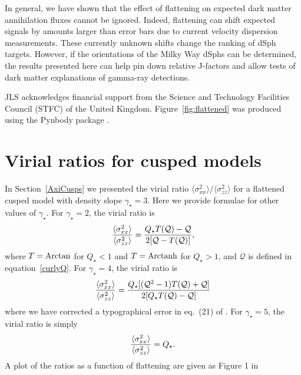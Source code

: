 \documentclass[prd,twocolumn,showpacs,preprintnumbers,superscriptaddress,nofootinbib,amsmath,amssymb,nobalancelastpage]{revtex4}
\def\arctanh{{\rm Arctanh}}
\def\arctan{{\rm Arctan}}
\begin{document}
In general, we have shown that the effect of flattening on expected dark matter annihilation fluxes cannot be ignored. Indeed, flattening can shift expected signals by amounts larger than error bars due to current velocity dispersion measurements. These currently unknown shifts change the ranking of dSph targets. However, if the orientations of the Milky Way dSphs can be determined, the results presented here can help pin down relative J-factors and allow tests of dark matter explanations of gamma-ray detections.

\begin{acknowledgments}
JLS acknowledges financial support from the Science and Technology Facilities Council (STFC) of the United Kingdom. Figure~\ref{fig:flattened} was produced using the Pynbody package \citep{Pynbody}.
\end{acknowledgments}



\appendix
\section{Virial ratios for cusped models}\label{CuspAppendix}
In Section~\ref{AxiCusps} we presented the virial ratio $\langle\sigma^2_{xx}\rangle/\langle\sigma^2_{zz}\rangle$ for a flattened cusped model with density slope $\gamma_\star=3$. Here we provide formulae for other values of $\gamma_\star$. For $\gamma_\star=2$, the virial ratio is
\begin{equation}
{\langle\sigma^2_{xx}\rangle \over \langle\sigma^2_{zz}\rangle}=\frac{Q_\star T(\mathcal{Q})-\mathcal{Q}}{2[\mathcal{Q}-T(\mathcal{Q})]},
\end{equation}
where $T=\arctan$ for $Q_\star<1$ and $T=\arctanh$ for $Q_\star>1$, and $\mathcal{Q}$ is defined in equation~\eqref{curlyQ}.
For $\gamma_\star=4$, the virial ratio is
%
\begin{equation}
{\langle\sigma^2_{xx}\rangle \over \langle\sigma^2_{zz}\rangle}=
\frac{Q_\star [ ( \mathcal{Q}^2-1)T(\mathcal{Q}) +
    \mathcal{Q}]}{2[Q_\star T(\mathcal{Q}) -\mathcal{Q}]}
\end{equation}
%
where we have corrected a typographical error in eq.~(21) of \citet{Ag12}. For $\gamma_\star=5$, the virial ratio is simply
\begin{equation}
{\langle\sigma^2_{xx}\rangle \over \langle\sigma^2_{zz}\rangle}=Q_\star.
\end{equation}
A plot of the ratios as a function of flattening are given as Figure 1
in \citep{Ag12}
\end{document}
